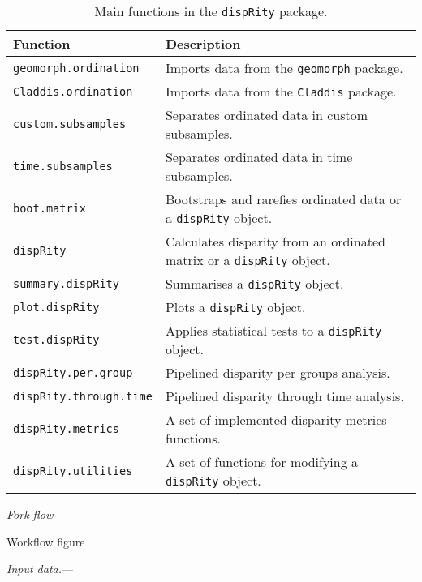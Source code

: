 \documentclass[12pt,letterpaper]{article}
\renewcommand{\subsection}[1]{%
\bigskip
\begin{center}
\begin{large}
\normalfont\itshape #1
\end{large}
\end{center}}
\renewcommand{\subsubsection}[1]{%
\vspace{2ex}
\noindent
\textit{#1.}---}
\begin{document}
\begin{table}
    \begin{tabular}{ll}
        \hline
        Function & Description \\ 
        \hline
        \texttt{geomorph.ordination} & Imports data from the \texttt{geomorph} package. \\
        \texttt{Claddis.ordination} & Imports data from the \texttt{Claddis} package. \\
        \texttt{custom.subsamples} & Separates ordinated data in custom subsamples. \\
        \texttt{time.subsamples} & Separates ordinated data in time subsamples. \\
        \texttt{boot.matrix} & Bootstraps and rarefies ordinated data or a \texttt{dispRity} object. \\
        \texttt{dispRity} & Calculates disparity from an ordinated matrix or a \texttt{dispRity} object. \\
        \texttt{summary.dispRity} & Summarises a \texttt{dispRity} object. \\
        \texttt{plot.dispRity} & Plots a \texttt{dispRity} object. \\
        \texttt{test.dispRity} & Applies statistical tests to a \texttt{dispRity} object.\\
        \texttt{dispRity.per.group} & Pipelined disparity per groups analysis. \\
        \texttt{dispRity.through.time} & Pipelined disparity through time analysis. \\
        \texttt{dispRity.metrics} & A set of implemented disparity metrics functions.\\
        \texttt{dispRity.utilities} & A set of functions for modifying a \texttt{dispRity} object.\\
        \hline
    \end{tabular}
    \caption{Main functions in the \texttt{dispRity} package.}
\end{table}

\subsection{Fork flow}

Workflow figure

\subsubsection{Input data}
\end{document}
